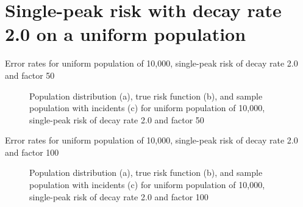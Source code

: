  
 
\section{Single-peak risk with decay rate 2.0 on a uniform population}
\label{sec:app:results_unif_2.0_1h}

\graphicspath{{./results/unif_50_2.0_1h/}}
\makeatletter
{}
\makeatother

\begin{table}[H]
    
    \caption[]{Error rates for uniform population of 10,000, single-peak risk of decay rate 2.0 and factor 50}
    \label{tab:mean_error_rates:unif_50_2.0_1h}
\end{table}

\begin{figure}[H]
    
    \caption[]{Population distribution (a), true risk function (b), and sample population with incidents (c) for uniform population of 10,000, single-peak risk of decay rate 2.0 and factor 50}
    \label{fig:distributions:unif_50_2.0_1h}    
\end{figure}


\graphicspath{{./results/unif_100_2.0_1h/}}
\makeatletter
{}
\makeatother

\begin{table}[H]

\caption[]{Error rates for uniform population of 10,000, single-peak risk of decay rate 2.0 and factor 100}
\label{tab:mean_error_rates:unif_100_2.0_1h}
\end{table}

\begin{figure}[H]
    
    \caption[]{Population distribution (a), true risk function (b), and sample population with incidents (c) for uniform population of 10,000, single-peak risk of decay rate 2.0 and factor 100}
    \label{fig:distributions:unif_100_2.0_1h}    
\end{figure}


\graphicspath{{./results/unif_200_2.0_1h/}}
\makeatletter
{}
\makeatother

